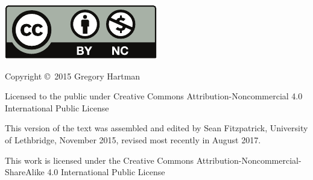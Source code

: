 \noindent\hskip -1in\begin{minipage}{2in}
\includegraphics{text/by-nc} 
\end{minipage}
\begin{minipage}{3in}
\noindent Copyright \copyright\ 2015 Gregory Hartman

Licensed to the public under Creative Commons Attribution-Noncommercial 4.0 International Public License
\end{minipage}

\bigskip

\bigskip



\bigskip

\begin{minipage}{3.3in}
This version of the text was assembled and edited by Sean Fitzpatrick, University of Lethbridge, November 2015, revised most recently in August 2017. 

This work is licensed under the Creative Commons Attribution-Noncommercial-ShareAlike 4.0 International Public License
\end{minipage}
